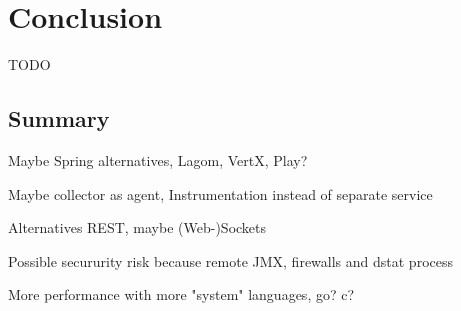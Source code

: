 \chapter{Conclusion}
\label{ch:conclusion}
TODO
\section{Summary}

Maybe Spring alternatives, Lagom, VertX, Play?

Maybe collector as agent, Instrumentation instead of separate service

Alternatives REST, maybe (Web-)Sockets

Possible secururity risk because remote JMX, firewalls and dstat process

More performance with more "system" languages, go? c?

